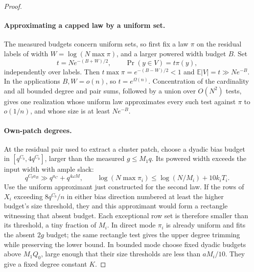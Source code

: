\begin{proof}\leavevmode\par
\paragraph{Approximating a capped law by a uniform set.}
The measured budgets concern uniform sets, so first fix a law \(\pi\) on the residual labels of width \(W=\log(N\max\pi)\), and a larger powered width budget \(B\). Set
\[
 t=Ne^{-(B+W)/2},\qquad \Pr(y\in V)=t\pi(y),
\]
independently over labels. Then \(t\max\pi=e^{-(B-W)/2}<1\) and \(\mathbb E|V|=t\gg Ne^{-B}\). In the applications \(B,W=o(n)\), so \(t=e^{\Omega(n)}\). Concentration of the cardinality and all bounded degree and pair sums, followed by a union over \(O(N^2)\) tests, gives one realization whose uniform law approximates every such test against \(\pi\) to \(o(1/n)\), and whose size is at least \(Ne^{-B}\).

\paragraph{Own-patch degrees.}
At the residual pair used to extract a cluster patch, choose a dyadic bias budget in \([q^{C_b},4q^{C_b}]\), larger than the measured \(g\le M_1q\). Its powered width exceeds the input width with ample slack:
\[
 q^{C_ba_B}\gg q^{a_C}+q^{4\omega M},\qquad
 \log(N\max\pi_i)\le\log(N/M_i)+10k_iT_i.
\]
Use the uniform approximant just constructed for the second law. If the rows of \(X_i\) exceeding \(8q^{C_b}/n\) in either bias direction numbered at least the higher budget's size threshold, they and this approximant would form a rectangle witnessing that absent budget. Each exceptional row set is therefore smaller than its threshold, a tiny fraction of \(M_i\). In direct mode \(\pi_i\) is already uniform and fits the absent \(2g\) budget; the same rectangle test gives the upper degree trimming while preserving the lower bound. In bounded mode choose fixed dyadic budgets above \(M_1Q_0\), large enough that their size thresholds are less than \(aM_i/10\). They give a fixed degree constant \(K\).


\end{proof}
